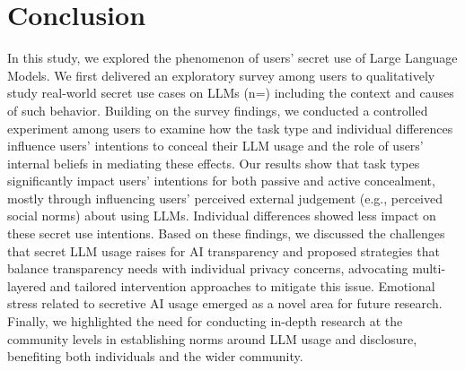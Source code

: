 \section{Conclusion}

In this study, we explored the phenomenon of users' secret use of Large Language Models. 
We first delivered an exploratory survey among \surveyallusernumber{} users to qualitatively study real-world secret use cases on LLMs (n=\surveycasenumber{}) including the context and causes of such behavior.
Building on the survey findings, we conducted a controlled experiment among \experimentvalidsamplesize{} users to examine how the task type and individual differences influence users' intentions to conceal their LLM usage and the role of users' internal beliefs in mediating these effects.
Our results show that task types significantly impact users' intentions for both passive and active concealment, mostly through influencing users' perceived external judgement (e.g., perceived social norms) about using LLMs. 
Individual differences showed less impact on these secret use intentions.
Based on these findings, we discussed the challenges that secret LLM usage raises for AI transparency and proposed strategies that balance transparency needs with individual privacy concerns, advocating multi-layered and tailored intervention approaches to mitigate this issue. 
Emotional stress related to secretive AI usage emerged as a novel area for future research. 
Finally, we highlighted the need for conducting in-depth research at the community levels in establishing norms around LLM usage and disclosure, benefiting both individuals and the wider community.